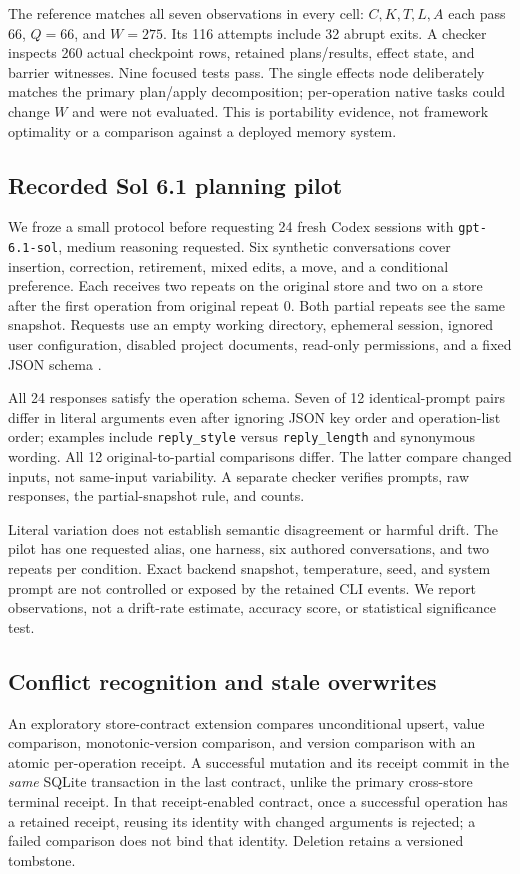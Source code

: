 \documentclass[10pt,letterpaper]{article}
\begin{document}
The reference matches all seven observations in every cell: $C,K,T,L,A$ each pass 66, $Q=66$, and $W=275$. Its 116 attempts include 32 abrupt exits. A checker inspects 260 actual checkpoint rows, retained plans/results, effect state, and barrier witnesses. Nine focused tests pass. The single effects node deliberately matches the primary plan/apply decomposition; per-operation native tasks could change $W$ and were not evaluated. This is portability evidence, not framework optimality or a comparison against a deployed memory system.

\subsection{Recorded Sol 6.1 planning pilot}
We froze a small protocol before requesting 24 fresh Codex sessions with \texttt{gpt-6.1-sol}, medium reasoning requested. Six synthetic conversations cover insertion, correction, retirement, mixed edits, a move, and a conditional preference. Each receives two repeats on the original store and two on a store after the first operation from original repeat 0. Both partial repeats see the same snapshot. Requests use an empty working directory, ephemeral session, ignored user configuration, disabled project documents, read-only permissions, and a fixed JSON schema \cite{openai2026codexexec}.

All 24 responses satisfy the operation schema. Seven of 12 identical-prompt pairs differ in literal arguments even after ignoring JSON key order and operation-list order; examples include \texttt{reply\_style} versus \texttt{reply\_length} and synonymous wording. All 12 original-to-partial comparisons differ. The latter compare changed inputs, not same-input variability. A separate checker verifies prompts, raw responses, the partial-snapshot rule, and counts.

Literal variation does not establish semantic disagreement or harmful drift. The pilot has one requested alias, one harness, six authored conversations, and two repeats per condition. Exact backend snapshot, temperature, seed, and system prompt are not controlled or exposed by the retained CLI events. We report observations, not a drift-rate estimate, accuracy score, or statistical significance test.



\subsection{Conflict recognition and stale overwrites}
\label{sec:conflicts}
An exploratory store-contract extension compares unconditional upsert, value comparison, monotonic-version comparison, and version comparison with an atomic per-operation receipt. A successful mutation and its receipt commit in the \emph{same} SQLite transaction in the last contract, unlike the primary cross-store terminal receipt. In that receipt-enabled contract, once a successful operation has a retained receipt, reusing its identity with changed arguments is rejected; a failed comparison does not bind that identity. Deletion retains a versioned tombstone.
\end{document}
